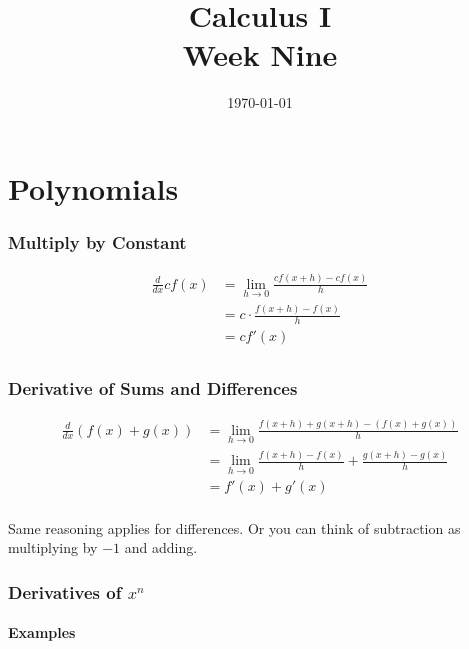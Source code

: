 \documentclass[letterpaper, portrait]{exam}
\author{}
\date{\today}
\title{Calculus I \\ Week Nine}
\begin{document}
  \maketitle
  \tableofcontents

  \part{Polynomials} %
  
  \section{Multiply by Constant} %
  \begin{align*}
    \frac{d}{dx} c f(x) & = \lim_{h \to 0} \frac{c f(x + h) - cf(x)}{h} \\
                        & = c \cdot \frac{f(x + h) - f(x)}{h} \\
                        & = c f'(x) \\
  \end{align*}

  \section{Derivative of Sums and Differences} %
  
  \begin{align*}
    \frac{d}{dx} (f(x) + g(x)) & = \lim_{h \to 0} \frac{f(x + h) + g(x + h) - (f(x) + g(x)) }{h} \\
                               & = \lim_{h \to 0} \frac{f(x + h) - f(x)}{h} + \frac{g(x + h) - g(x)}{h} \\
                               & = f'(x) + g'(x) \\
  \end{align*}

  Same reasoning applies for differences. Or you can think of subtraction as multiplying by $-1$ and adding.

  \section{Derivatives of $x^n$}

  \subsection{Examples} %
  
\end{document}

